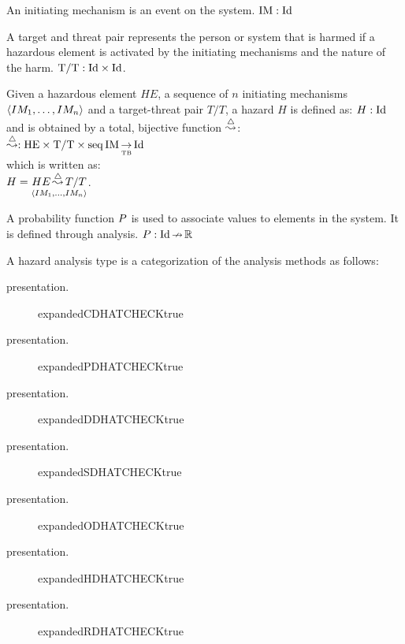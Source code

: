
\begin{definition}
An initiating mechanism is an event on the system.
%
$\hmdatatypeIM: \hmdatatypeId$
\end{definition}

\begin{definition}
A target and threat pair represents the person or system that is harmed if a hazardous element is activated by the initiating mechanisms and the nature of the harm. 
%
$\hmdatatypeTT: \hmcartesian{\hmdatatypeId}{\hmdatatypeId}$.
\end{definition}

\begin{definition}[Hazard]
Given a hazardous element $HE$, a sequence of $n$ initiating mechanisms $\hmseqenum{IM_1, \ldots, IM_n}$ and a target-threat pair $T/T$, a hazard $H$ is defined as: $H: \hmdatatypeId$ and is obtained by a total, bijective function $\hmhazardsymbol$: 
%
\\$\hmhazardsymbol: \hmtotalbijectivefunction{\hmcartesian{\hmcartesian{\hmdatatypeHE}{\hmdatatypeTT}}{\hmseq{\hmdatatypeIM}}}{\hmdatatypeId}$
%
\\which is written as:
%
\\$H = \hmhazard{HE}{\hmseqenum{IM_1, \ldots, IM_n}}{T/T}$.
\end{definition}

\begin{definition}
A probability function $\hmprobabilitysymbol$ is used to associate values to elements in the system.
%
It is defined through analysis. 
%
$\hmprobabilitysymbol: \hmpartialfunction{\hmdatatypeId}{\hmdatatypeR}$
\end{definition}

\begin{definition}
A hazard analysis type is a categorization of the analysis methods as follows:
%
\newcommand{\HATdescr}[1]{\item[\expandafter\csname #1presentation\endcsname.] \expandafter\csname #1expanded\endcsname\csname #1CHECKtrue\endcsname}
%
\begin{description}
  \HATdescr{CDHAT}
  \HATdescr{PDHAT}
  \HATdescr{DDHAT}
  \HATdescr{SDHAT}
  \HATdescr{ODHAT}
  \HATdescr{HDHAT}
  \HATdescr{RDHAT} 
\end{description}
\end{definition}

